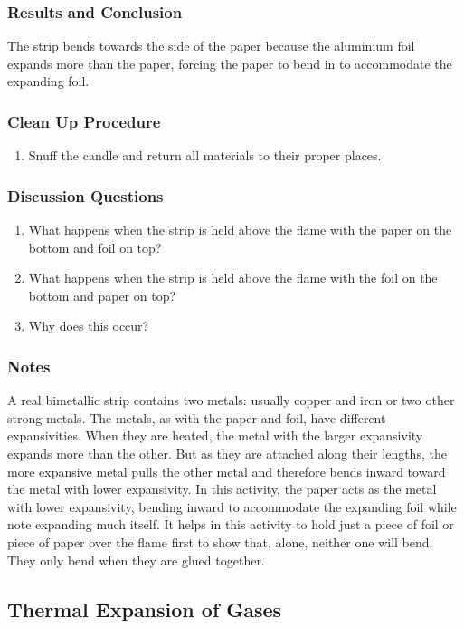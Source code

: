 \subsubsection*{Results and Conclusion}
The strip bends towards the side of the paper because the aluminium foil expands more than the paper, forcing the paper to bend in to accommodate the expanding foil.  

\subsubsection*{Clean Up Procedure}
\begin{enumerate}
\item{Snuff the candle and return all materials to their proper places.} 
\end{enumerate}

\subsubsection*{Discussion Questions}
\begin{enumerate}
\item{What happens when the strip is held above the flame with the paper on the bottom and foil on top?}
\item{What happens when the strip is held above the flame with the foil on the bottom and paper on top?}
\item{Why does this occur?}
\end{enumerate}

\subsubsection*{Notes}
A real bimetallic strip contains two metals: usually copper and iron or two other strong metals. The metals, as with the paper and foil, have different expansivities. When they are heated, the metal with the larger expansivity expands more than the other. But as they are attached along their lengths, the more expansive metal pulls the other metal and therefore bends inward toward the metal with lower expansivity.  
In this activity, the paper acts as the metal with lower expansivity, bending inward to accommodate the expanding foil while note expanding much itself.  
It helps in this activity to hold just a piece of foil or piece of paper over the flame first to show that, alone, neither one will bend. They only bend when they are glued together.  

\subsection{Thermal Expansion of Gases}

